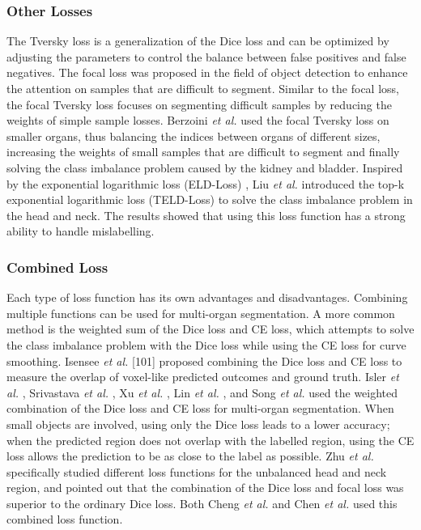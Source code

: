 \documentclass[lettersize,journal]{IEEEtran}
\begin{document}
\subsubsection{Other Losses}
The Tversky loss \cite{178} is a generalization of the Dice loss and can be optimized by adjusting the parameters to control the balance between false positives and false negatives. The focal loss \cite{179} was proposed in the field of object detection to enhance the attention on samples that are difficult to segment. Similar to the focal loss, the focal Tversky loss \cite{182} focuses on segmenting difficult samples by reducing the weights of simple sample losses. Berzoini {\it{et al.}} \cite{78} used the focal Tversky loss on smaller organs, thus balancing the indices between organs of different sizes, increasing the weights of small samples that are difficult to segment and finally solving the class imbalance problem caused by the kidney and bladder. Inspired by the exponential logarithmic loss (ELD-Loss) \cite{183}, Liu {\it{et al.}} \cite{45} introduced the top-k exponential logarithmic loss (TELD-Loss) to solve the class imbalance problem in the head and neck. The results showed that using this loss function has a strong ability to handle mislabelling.

\subsubsection{Combined Loss}
Each type of loss function has its own advantages and disadvantages. Combining multiple functions can be used for multi-organ segmentation. A more common method is the weighted sum of the Dice loss and CE loss, which attempts to solve the class imbalance problem with the Dice loss while using the CE loss for curve smoothing. Isensee {\it{et al.}} [101] proposed combining the Dice loss and CE loss to measure the overlap of voxel-like predicted outcomes and ground truth. Isler {\it{et al.}} \cite{54}, Srivastava {\it{et al.}} \cite{49}, Xu {\it{et al.}} \cite{77}, Lin {\it{et al.}} \cite{70}, and Song {\it{et al.}} \cite{73} used the weighted combination of the Dice loss and CE loss for multi-organ segmentation. When small objects are involved, using only the Dice loss leads to a lower accuracy; when the predicted region does not overlap with the labelled region, using the CE loss allows the prediction to be as close to the label as possible. Zhu {\it{et al.}} \cite{39} specifically studied different loss functions for the unbalanced head and neck region, and pointed out that the combination of the Dice loss and focal loss was superior to the ordinary Dice loss. Both Cheng {\it{et al.}} \cite{184} and Chen {\it{et al.}} \cite{44} used this combined loss function.
\end{document}
